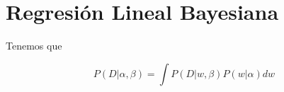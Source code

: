 \section{Regresión Lineal Bayesiana}

Tenemos que

\begin{equation}
    P(D|\alpha,\beta)=\int  P(D|w,\beta)P(w|\alpha)dw
\end{equation}







    


